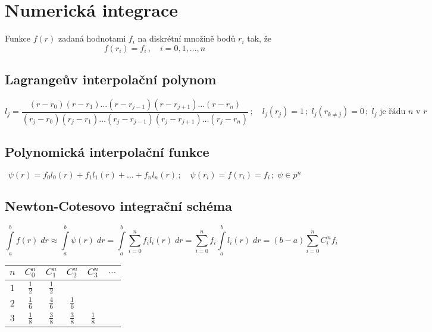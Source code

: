 \documentclass[10pt,oneside]{article}
\begin{document}
\newpage
\section*{Numerická integrace}

Funkce $f(r)$ zadaná hodnotami $f_i$ na diskrétní množině bodů $r_i$ tak, že
%
\begin{equation*}
	f(r_i) = f_i \,,\quad i = 0,1,\dots,n
\end{equation*}

\subsection*{Lagrangeův interpolační polynom}
\begin{equation*}
l_j = \frac{(r-r_0)(r-r_1)\dots(r-r_{j-1})(r-r_{j+1})\dots(r-r_n)}{(r_j-r_0)(r_j-r_1)\dots(r_j-r_{j-1})(r_j-r_{j+1})\dots(r_j-r_n)}
\,;\quad
l_j(r_j) = 1 \,;\;
l_j(r_{k \neq j}) = 0 \,;\;
l_j \text{ je řádu $n$ v $r$}
\end{equation*}

\subsection*{Polynomická interpolační funkce}
\begin{equation*}
\psi(r) = f_0 l_0(r) + f_1 l_1(r) + \dots + f_n l_n(r)
\,;\quad
\psi(r_i) = f(r_i) = f_i \,;\;
\psi \in p^n
\end{equation*}

\subsection*{Newton-Cotesovo integrační schéma}
\begin{equation*}
\int\limits_a^b f(r)\;dr \approx \int\limits_a^b \psi(r)\;dr = \int\limits_a^b \sum\limits_{i=0}^n f_i l_i(r)\;dr = \sum\limits_{i=0}^n f_i \int\limits_a^b l_i(r)\;dr = (b-a) \sum\limits_{i=0}^n C_i^{\,n} f_i
\end{equation*}

\begin{center}
	\renewcommand\arraystretch{1.3}
	\begin{tabular}{|c|ccccc|}
		\hline
		$n$ & $C_0^n$ & $C_1^n$ & $C_2^n$ & $C_3^n$ & $\dots$ \\ \hline
		$1$ & $\frac{1}{2}$ & $\frac{1}{2}$ &&&\\
		$2$ & $\frac{1}{6}$ & $\frac{4}{6}$ & $\frac{1}{6}$ &&\\
		$3$ & $\frac{1}{8}$ & $\frac{3}{8}$ & $\frac{3}{8}$ & $\frac{1}{8}$ &\\ \hline
	\end{tabular}
\end{center}
\end{document}
